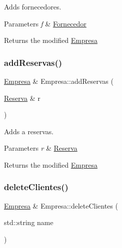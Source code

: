 Adds fornecedores. 


\begin{DoxyParams}{Parameters}
{\em f} & \hyperlink{classFornecedor}{Fornecedor}\\
\hline
\end{DoxyParams}
\begin{DoxyReturn}{Returns}
the modified \hyperlink{classEmpresa}{Empresa} 
\end{DoxyReturn}
\mbox{\label{classEmpresa_a42a1671b234ab8380cfb2ed33517edb2}} 
\subsubsection{\texorpdfstring{add\+Reservas()}{addReservas()}}
{\footnotesize\ttfamily \hyperlink{classEmpresa}{Empresa} \& Empresa\+::add\+Reservas (\begin{DoxyParamCaption}\item[{\hyperlink{classReserva}{Reserva} \&}]{r }\end{DoxyParamCaption})}



Adds a reservas. 


\begin{DoxyParams}{Parameters}
{\em r} & \hyperlink{classReserva}{Reserva}\\
\hline
\end{DoxyParams}
\begin{DoxyReturn}{Returns}
the modified \hyperlink{classEmpresa}{Empresa} 
\end{DoxyReturn}
\mbox{\label{classEmpresa_a52b9f4d94c2a05704d74854ed4dd1590}} 
\subsubsection{\texorpdfstring{delete\+Clientes()}{deleteClientes()}}
{\footnotesize\ttfamily \hyperlink{classEmpresa}{Empresa} \& Empresa\+::delete\+Clientes (\begin{DoxyParamCaption}\item[{std\+::string}]{name }\end{DoxyParamCaption})}



